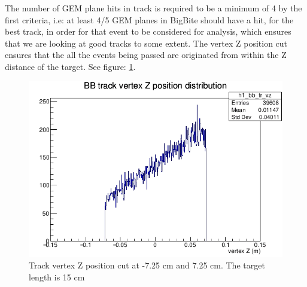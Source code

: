 The number of GEM plane hits in track is required to be a minimum of 4 by the first criteria, i.e: at least 4/5 GEM planes in BigBite should have a hit, for the best track, in order for that event to be considered for analysis, which ensures that we are looking at good tracks to some extent. The vertex Z position cut ensures that the all the events being passed are originated from within the Z distance of the target. See figure: \ref{fig:Track_vertex_z_position_cut}. 


\begin{figure}[h!]
    \centering
    \includegraphics[scale=0.75]{Images/sbs9_hydrogen_analysis/BBTrVzCut.png}
    \caption{Track vertex Z position cut at -7.25 cm and 7.25 cm. The target length is 15 cm}
    \label{fig:Track_vertex_z_position_cut}
\end{figure}

